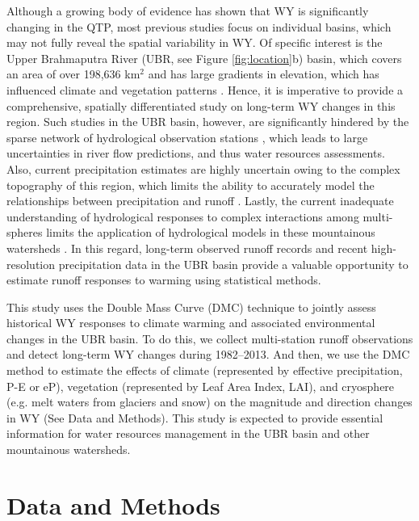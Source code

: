 \documentclass[hess, manuscript]{copernicus}
\begin{document}
Although a growing body of evidence has shown that WY is significantly changing in the QTP, most previous studies focus on individual basins, which may not fully reveal the spatial variability in WY. Of specific interest is the Upper Brahmaputra River (UBR, see Figure \ref{fig:location}b) basin, which covers an area of over 198,636 km$^2$ and has large gradients in elevation, which has influenced climate and vegetation patterns \citep{li2019spatiotemporal,gao2018does}. Hence, it is imperative to provide a comprehensive, spatially differentiated study on long-term WY changes in this region. Such studies in the UBR basin, however, are significantly hindered by the sparse network of hydrological observation stations \citep{li2019spatiotemporal,wang2021tp,yao2019recent}, which leads to large uncertainties in river flow predictions, and thus water resources assessments. Also, current precipitation estimates are highly uncertain owing to the complex topography of this region, which limits the ability to accurately model the relationships between precipitation and runoff \citep{sun2020precipitation}. Lastly, the current inadequate understanding of hydrological responses to complex interactions among multi-spheres limits the application of hydrological models in these mountainous watersheds \citep{pellicciotti2012challenges}. In this regard, long-term observed runoff records and recent high-resolution precipitation data in the UBR basin provide a valuable opportunity to estimate runoff responses to warming using statistical methods. 

This study uses the Double Mass Curve (DMC) technique to jointly assess historical WY responses to climate warming and associated environmental changes in the UBR basin. To do this, we collect multi-station runoff observations and detect long-term WY changes during 1982--2013. And then, we use the DMC method to estimate the effects of climate (represented by effective precipitation, P-E or eP), vegetation (represented by Leaf Area Index, LAI), and cryosphere (e.g. melt waters from glaciers and snow) on the magnitude and direction changes in WY (See Data and Methods). This study is expected to provide essential information for water resources management in the UBR basin and other mountainous watersheds. 

\section{Data and Methods}
\end{document}
